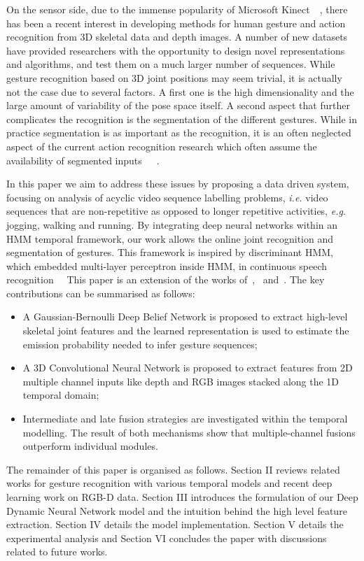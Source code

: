 On the sensor side, due to the immense popularity of Microsoft Kinect~\cite{shotton2011real}~\cite{lingshao2}, there has been a recent interest in developing methods for human gesture and action recognition from 3D skeletal data and depth images.
A number of new datasets~\cite{ICMI,fothergill2012instructing,guyon2012chalearn,wang2012mining} have provided researchers with the opportunity to design novel representations and algorithms, and test them on a much larger number of sequences.
While gesture recognition based on 3D joint positions may seem trivial, it is actually not the case due to several factors. A first one is the high dimensionality and the large amount of variability of the pose space itself.
A second aspect that further complicates the recognition is the segmentation of the different gestures. While in practice segmentation is as important as the recognition, it is an often neglected aspect of the current action recognition research which often assume the availability of segmented inputs~\cite{laptev2005space}~\cite{marszalek09}~\cite{Kuehne11}.

In this paper we aim to address these issues by proposing a data driven system, focusing on analysis of acyclic video sequence labelling problems, \emph{i.e.} video sequences that are non-repetitive as opposed to longer repetitive activities, \textit{e.g.} jogging, walking and running. By integrating deep neural networks within an HMM temporal framework, our work allows the online joint recognition and segmentation of gestures. This framework is inspired by discriminant HMM, which embedded multi-layer perceptron inside HMM, in continuous speech recognition~\cite{renals1994connectionist}~\cite{bourlard1994connectionist}
This paper is an extension of the works of~\cite{diwucvpr14},~\cite{wu2014deep} and~\cite{lio2014deep}.
The key contributions can be summarised as follows:
\begin{itemize}
\item A Gaussian-Bernoulli Deep Belief Network is proposed to extract high-level skeletal joint features and the learned representation is used to estimate the emission probability needed to infer gesture sequences;
\item A 3D Convolutional Neural Network  is proposed to extract features from 2D multiple channel inputs 
like  depth and RGB images stacked along the 1D temporal domain;
\item Intermediate and late fusion strategies are investigated within the temporal modelling. The result of both mechanisms
show that multiple-channel fusions outperform individual modules.
\end{itemize}

The remainder of this paper is organised as follows. Section II reviews related works for gesture recognition with various temporal models and recent deep learning work on RGB-D data. Section III introduces the formulation of our Deep Dynamic Neural Network model and the intuition behind the high level feature extraction. Section IV details the model implementation. Section V details the experimental analysis and Section VI concludes the paper with discussions related to future works.


\endinput
